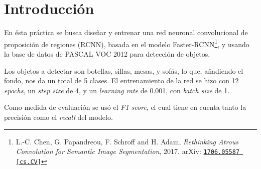 \section{Introducción}
En ésta práctica se busca diseñar y entrenar una red neuronal convolucional de proposición de regiones (RCNN), basada en el modelo Faster-RCNN\footnote{L.-C. Chen, G. Papandreou, F. Schroff and H. Adam, \textit{Rethinking Atrous Convolution for Semantic Image Segmentation}, 2017. arXiv: \href{https://arxiv.org/abs/1706.05587}{\texttt{1706.05587 [cs.CV]}}}, y usando la base de datos de PASCAL VOC 2012 para detección de objetos.

Los objetos a detectar son botellas, sillas, mesas, y sofás, lo que, añadiendo el fondo, nos da un total de 5 clases. El entrenamiento de la red se hizo con 12 \textit{epochs}, un \textit{step size} de 4, y un \textit{learning rate} de 0.001, con \textit{batch size} de 1.

Como medida de evaluación se usó el \textit{F1 score}, el cual tiene en cuenta tanto la precisión como el \textit{recall} del modelo.
